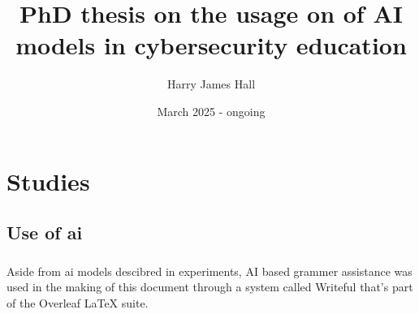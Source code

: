 \documentclass{book}
\title{PhD thesis on the usage on of AI models in cybersecurity education}
\author{Harry James Hall}
\date{March 2025 - ongoing}
\begin{document}
\frontmatter

\maketitle
\tableofcontents



\mainmatter





\chapter{Studies}


\backmatter


\printglossary[type=\acronymtype]
\printbibliography{}
\section*{Use of \acrshort{ai}}
\paragraph{}Aside from \acrshort{ai} models descibred in experiments, AI based grammer assistance was used in the making of this document through a system called Writeful that's part of the Overleaf LaTeX suite.



\printglossary
\end{document}
